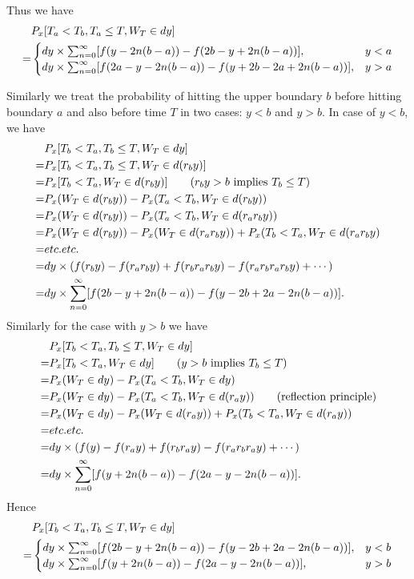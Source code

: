 Thus we have
\begin{align}
	 & P_x[T_a<T_b, T_a\le T, W_T\in dy]  \notag \\
	=& \begin{cases}
     	 dy\times\sum_{n=0}^{\infty} [ f(y-2n(b-a)) - f(2b-y+2n(b-a)) ],         & y<a \\
	     dy\times\sum_{n=0}^{\infty} [ f(2a-y-2n(b-a)) - f(y+2b-2a + 2n(b-a)) ], & y>a
     \end{cases}
\end{align}

Similarly we treat the probability of hitting the upper boundary $b$ before 
hitting boundary $a$ and also before time $T$ in two cases: $y<b$ and $y>b$.
In case of $y<b$, we have
\begin{align*}
	&P_x[T_b<T_a, T_b\le T, W_T\in dy]  \notag \\
	=& P_x[T_b<T_a, T_b\le T, W_T\in d(r_b y)]  \notag \\
	=& P_x[T_b<T_a, W_T\in d(r_b y)]  \qquad \text{($r_b y>b$ implies $T_b\le T$)} 
	   \notag \\
  =& P_x(W_T\in d(r_b y)) - P_x(T_a<T_b, W_T\in d(r_b y)) \notag \\
	=& P_x(W_T\in d(r_b y)) - P_x(T_a<T_b, W_T\in d(r_a r_b y))  \notag \\
  =& P_x(W_T\in d(r_b y)) - P_x(W_T\in d(r_a r_b y))
     + P_x(T_b<T_a, W_T\in d(r_a r_b y)  \notag \\
  =& etc.etc. \notag \\
  =& dy\times (f(r_b y) - f(r_a r_b y) + f(r_b r_a r_b y) - f(r_a r_b r_a r_b y)
		 + \cdots) \\
  =& dy\times\sum_{n=0}^{\infty} [ f(2b-y+2n(b-a)) - f(y-2b+2a - 2n(b-a)) ].
\end{align*}
Similarly for the case with $y>b$ we have
\begin{align*}
	&P_x[T_b<T_a, T_b\le T, W_T\in dy]  \notag \\
	=&  P_x[T_b<T_a, W_T\in dy]   \qquad \text{($y>b$ implies $T_b\le T$)}
	    \notag \\
  =& P_x(W_T\in dy) - P_x(T_a<T_b, W_T\in dy)   \notag \\
	=& P_x(W_T\in dy) - P_x(T_a<T_b, W_T\in d(r_a y)) 
			\qquad \text{(reflection principle)}  \notag \\
	=& P_x(W_T\in dy) - P_x(W_T\in d(r_a y)) 
     + P_x(T_b<T_a, W_T\in d(r_a y))  \notag \\
	=& etc.etc.   \notag \\
  =& dy\times (f(y) - f(r_a y) + f(r_b r_a y) - f(r_a r_b r_a y)
		 + \cdots) \\
	=& dy\times\sum_{n=0}^{\infty} [ f(y+2n(b-a)) - f(2a-y-2n(b-a)) ].
\end{align*}
Hence
\begin{align}
	& P_x[T_b<T_a, T_b\le T, W_T\in dy]  \notag \\
	=& 
    \begin{cases}
			dy\times\sum_{n=0}^{\infty} [ f(2b-y+2n(b-a)) - f(y-2b+2a - 2n(b-a)) ], & y<b \\
			dy\times\sum_{n=0}^{\infty} [ f(y+2n(b-a)) - f(2a-y-2n(b-a)) ],  & y>b
    \end{cases}
\end{align}

